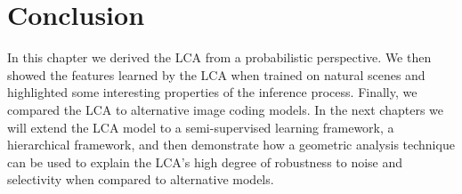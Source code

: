 
\section{Conclusion}
In this chapter we derived the LCA from a probabilistic perspective. We then showed the features learned by the LCA when trained on natural scenes and highlighted some interesting properties of the inference process. Finally, we compared the LCA to alternative image coding models. In the next chapters we will extend the LCA model to a semi-supervised learning framework, a hierarchical framework, and then demonstrate how a geometric analysis technique can be used to explain the LCA's high degree of robustness to noise and selectivity when compared to alternative models.
